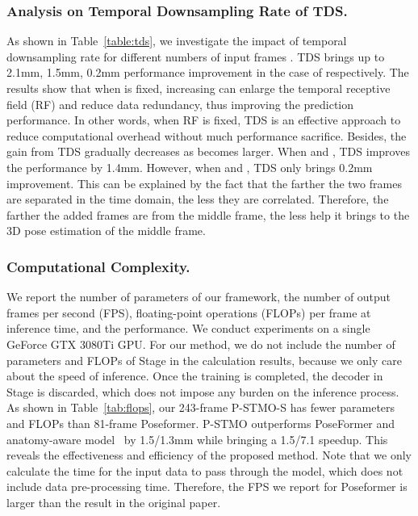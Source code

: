 \documentclass[]{llncs}
\newcommand{\RNum}[1]{\uppercase\expandafter{\romannumeral #1\relax}}
\begin{document}
\subsubsection{Analysis on Temporal Downsampling Rate of TDS.} As shown in Table~\ref{table:tds}, we investigate the impact of temporal downsampling rate  for different numbers of input frames . TDS brings up to 2.1mm, 1.5mm, 0.2mm performance improvement in the case of  respectively. The results show that when  is fixed, increasing  can enlarge the temporal receptive field (RF) and reduce data redundancy, thus improving the prediction performance. In other words, when RF is fixed, TDS is an effective approach to reduce computational overhead without much performance sacrifice. Besides, the gain from TDS gradually decreases as  becomes larger. When  and , TDS improves the performance by 1.4mm. However, when  and , TDS only brings 0.2mm improvement. This can be explained by the fact that the farther the two frames are separated in the time domain, the less they are correlated. Therefore, the farther the added frames are from the middle frame, the less help it brings to the 3D pose estimation of the middle frame. 

\subsubsection{Computational Complexity.}
We report the number of parameters of our framework, the number of output frames per second (FPS), floating-point operations (FLOPs) per frame at inference time, and the performance. We conduct experiments on a single GeForce GTX 3080Ti GPU. For our method, we do not include the number of parameters and FLOPs of Stage \RNum{1} in the calculation results, because we only care about the speed of inference. Once the training is completed, the decoder in Stage \RNum{1} is discarded, which does not impose any burden on the inference process. As shown in Table~\ref{tab:flops}, our 243-frame P-STMO-S has fewer parameters and FLOPs than 81-frame Poseformer. P-STMO outperforms PoseFormer and anatomy-aware model~\cite{chen2021anatomy} by 1.5/1.3mm while bringing a 1.5/7.1 speedup. This reveals the effectiveness and efficiency of the proposed method. Note that we only calculate the time for the input data to pass through the model, which does not include data pre-processing time. Therefore, the FPS we report for Poseformer is larger than the result in the original paper.
\end{document}
